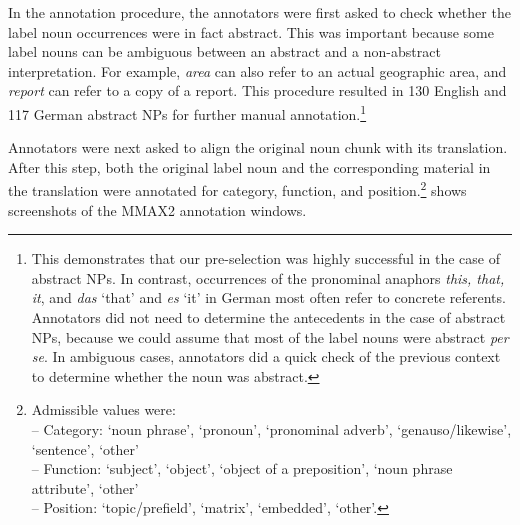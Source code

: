 \documentclass[output=paper]{LSP/langsci}
\begin{document}
In the annotation procedure, the annotators were first asked to check whether the label noun occurrences were in fact abstract. This was important because some label nouns can be ambiguous between an abstract and a non-abstract interpretation. For example, \textit{area} can also refer to an actual geographic area, and \textit{report} can refer to a copy of a report. This procedure resulted in 130 English and 117 German abstract NPs for further manual annotation.\footnote{%
This demonstrates that our pre-selection was highly successful in the case of abstract NPs. In contrast, occurrences of the pronominal anaphors \textit{this, that, it}, and \textit{das} `that' and \textit{es} `it' in German most often refer to concrete referents. \\
Annotators did not need to determine the antecedents in the case of abstract NPs, because we could assume that most of the label nouns were abstract \emph{per se}. In ambiguous cases, annotators did a quick check of the previous context to determine whether the noun was abstract.
}

Annotators were next asked to align the original noun chunk with its translation. %
After this step, both the original label noun and the corresponding material in the translation were annotated for category, function, and position.\footnote{%
Admissible values were: \\
-- Category: `noun phrase', `pronoun', `pronominal adverb', `genauso/likewise', `sentence', `other' \\
-- Function: `subject', `object', `object of a preposition', `noun phrase attribute', `other' \\
-- Position: `topic/prefield', `matrix', `embedded', `other'.
} %
 shows screenshots of the MMAX2 annotation windows.
\end{document}
